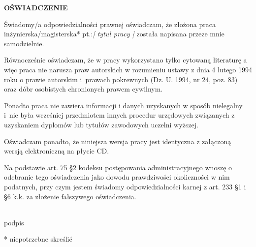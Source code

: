 \documentclass[a4paper,12pt,twoside,openright]{book}
\begin{document}
    \vspace{3cm}
    \centerline{\large \textbf{OŚWIADCZENIE}}\vspace{1cm}
    
    Świadomy/a odpowiedzialności prawnej oświadczam, że złożona praca inżynierska/magisterska* pt.:\textit{[ tytuł pracy ]} została napisana przeze mnie samodzielnie. 
    
    Równocześnie oświadczam, że w pracy wykorzystano tylko cytowaną literaturę a więc praca nie narusza praw autorskich w rozumieniu ustawy z dnia 4 lutego 1994 roku o prawie autorskim i prawach pokrewnych (Dz. U. 1994, nr 24, poz. 83) oraz dóbr osobistych chronionych prawem cywilnym. 
    
    Ponadto praca nie zawiera informacji i danych uzyskanych w sposób nielegalny i nie była wcześniej przedmiotem innych procedur urzędowych związanych z uzyskaniem dyplomów lub tytułów zawodowych uczelni wyższej. 
    
    Oświadczam ponadto, że niniejsza wersja pracy jest identyczna z załączoną wersją elektroniczną na płycie CD.
    
    \color{red} 
    Na podstawie art. 75 §2 kodeksu postępowania administracyjnego wnoszę o odebranie tego oświadczenia jako dowodu prawdziwości okoliczności w nim podatnych, przy czym jestem świadomy odpowiedzialności karnej z art. 233 §1 i §6 k.k. za złożenie fałszywego oświadczenia. 
    \color{black}
    
    \vspace{1.5cm}
    \begin{flushright}
        \begin{minipage}{.5\linewidth}
            \begin{center}
                \dotfill \\
                podpis
            \end{center}
        \end{minipage}
    \end{flushright}
    
    \vfill
    \begin{flushleft}
    * niepotrzebne skreślić
    \end{flushleft}
    
    \newpage
    \tableofcontents
\end{document}
